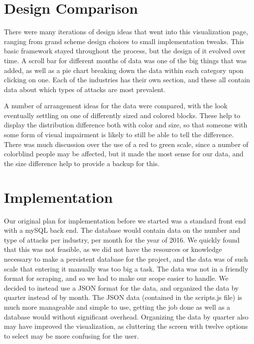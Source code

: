 \documentclass[journal]{vgtc}                %
\begin{document}
\section{Design Comparison}
There were many iterations of design ideas that went into this visualization page, ranging from grand scheme design choices to small implementation tweaks.
This basic framework stayed throughout the process, but the design of it evolved over time. 
A scroll bar for different months of data was one of the big things that was added, as well as a pie chart breaking down the data within each category upon clicking on one.
Each of the industries has their own section, and these all contain data about which types of attacks are most prevalent.

A number of arrangement ideas for the data were compared, with the look eventually settling on one of differently sized and colored blocks.
These help to display the distribution difference both with color and size, so that someone with some form of visual impairment is likely to still be able to tell the difference.
There was much discussion over the use of a red to green scale, since a number of colorblind people may be affected, but it made the most sense for our data, and the size difference help to provide a backup for this.

\section{Implementation}
Our original plan for implementation before we started was a standard front end with a mySQL back end. The database 
would contain data on the number and type of attacks per industry, per month for the year of 2016. We quickly found
that this was not feasible, as we did not have the resources or knowledge necessary to make a persistent database for
the project, and the data was of such scale that entering it manually was too big a task. The data was not in a friendly
format for scraping, and so we had to make our scope easier to handle. We decided to instead use a JSON format for the 
data, and organized the data by quarter instead of by month. The JSON data (contained in the scripts.js file) is much
more manageable and simple to use, getting the job done as well as a database would without significant overhead.
Organizing the data by quarter also may have improved the visualization, as cluttering the screen with twelve options
to select may be more confusing for the user.
\end{document}
